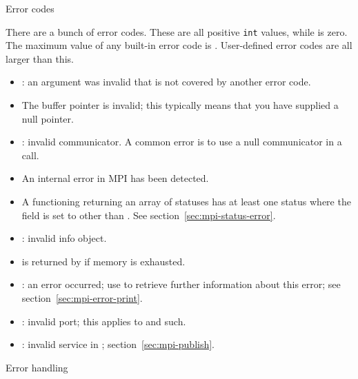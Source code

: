  {Error codes}
\label{sec:mpi-err-codes}

There are a bunch of error codes. These are all positive \lstinline{int} values,
while  is zero.
The maximum value of any built-in error code is .
User-defined error codes are all larger than this.

\begin{itemize}
\item {}: an argument was invalid that is not
  covered by another error code.
\item {} The buffer pointer is invalid;
  this typically means that you have supplied a null pointer.
\item {}: 
  invalid communicator. A common error is to use a null communicator in
  a call.
\item {} An internal error in MPI has been detected.
\item {} A functioning returning an array of statuses
  has at least one status where the  field is set
  to other than . See section~\ref{sec:mpi-status-error}.
\item {}: 
  invalid info object.
\item {} is returned by 
  if memory is exhausted.
\item {}: an error occurred; use
   to retrieve further information
  about this error; see section~\ref{sec:mpi-error-print}.
\item {}: invalid port; this applies to
   and such.
\item {}: invalid service in
  ; section~\ref{sec:mpi-publish}.
\end{itemize}

 {Error handling}
\label{sec:mpi-error}

